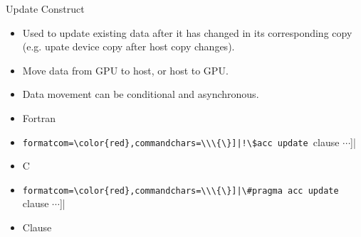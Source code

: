 \documentclass[c,mathserif,compress,xcolor=svgnames]{beamer}
\newcommand{\Verbred}[1]{\Verb[formatcom=\color{red},commandchars=\\\{\}]|#1|}
\begin{document}
\begin{frame}[fragile]{\small Update Construct}
  \begin{itemize}
    \item Used to update existing data after it has changed in its corresponding copy (e.g. upate device copy after host copy changes).
    \item Move data from GPU to host, or host to GPU.
    \item Data movement can be conditional and asynchronous.
    \item Fortran
    \item[] \Verbred{!\$acc update [clause $\cdots$]}
    \item C
    \item[] \Verbred{\#pragma acc update [clause $\cdots$]}
    \item Clause
  \end{itemize}
\end{frame}

\begin{frame}[fragile]
  \begin{columns}[t]
     
     
  \end{columns}
\end{frame}
\end{document}
